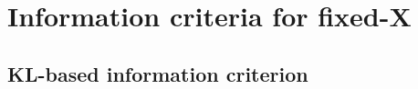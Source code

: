 \section{ Information criteria for fixed-X }
\label{sec:ic_fixedx}
\subsection{KL-based information criterion}

